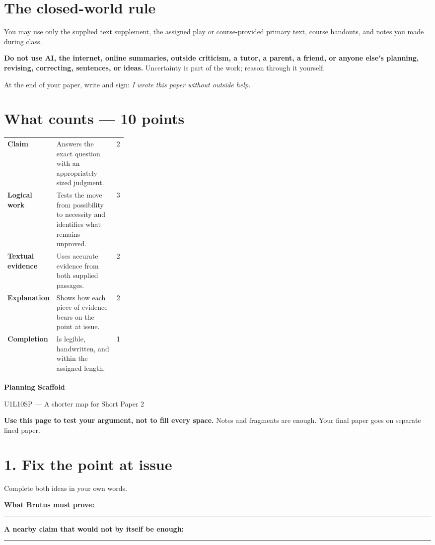 \documentclass[11pt]{article}
\newcommand{\blankline}{\par\vspace{0.12em}\noindent\rule{\linewidth}{0.4pt}\par\vspace{0.38em}}
\begin{document}
\section*{The closed-world rule}
You may use only the supplied text supplement, the assigned play or course-provided primary text, course handouts, and notes you made during class.

\textbf{Do not use AI, the internet, online summaries, outside criticism, a tutor, a parent, a friend, or anyone else's planning, revising, correcting, sentences, or ideas.} Uncertainty is part of the work; reason through it yourself.

At the end of your paper, write and sign: \emph{I wrote this paper without outside help.}

\section*{What counts --- 10 points}
\begin{tabularx}{\linewidth}{>{\bfseries}p{0.28\linewidth}Xr}
Claim & Answers the exact question with an appropriately sized judgment. & 2\\
Logical work & Tests the move from possibility to necessity and identifies what remains unproved. & 3\\
Textual evidence & Uses accurate evidence from both supplied passages. & 2\\
Explanation & Shows how each piece of evidence bears on the point at issue. & 2\\
Completion & Is legible, handwritten, and within the assigned length. & 1\\
\end{tabularx}
\endgroup

\newpage
\begin{center}
{\Large\bfseries Planning Scaffold}\par
{\large U1L10SP --- A shorter map for Short Paper 2}
\end{center}
\textbf{Use this page to test your argument, not to fill every space.} Notes and fragments are enough. Your final paper goes on separate lined paper.

\section*{1. Fix the point at issue}
Complete both ideas in your own words.

\textbf{What Brutus must prove:}
\blankline
\textbf{A nearby claim that would not by itself be enough:}
\blankline
\end{document}

